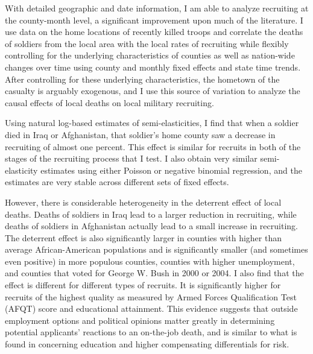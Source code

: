 \documentclass[12pt] {article}
\begin{document}
With detailed geographic and date information, I am able to analyze recruiting at the county-month
level, a significant improvement upon much of the literature. I use data on the home locations of recently killed troops and correlate the deaths of soldiers from the local area with the local rates of recruiting while flexibly controlling for the underlying characteristics of counties as well as nation-wide changes over time using county and monthly fixed effects and state time trends. After controlling for these underlying characteristics, the hometown of the casualty is arguably exogenous, and I use this source of variation to analyze the causal effects of local deaths on local military recruiting. 

Using natural log-based estimates of semi-elasticities, I
find that when a soldier died in Iraq or Afghanistan, that soldier's
home county saw a decrease in recruiting of almost one percent. This
effect is similar for recruits in both of the stages of the recruiting
process that I test. I also obtain very similar semi-elasticity estimates
using either Poisson or negative binomial regression, and the estimates are very stable across different sets of fixed effects. %

However, there is considerable heterogeneity in the deterrent effect of local deaths. Deaths of soldiers in Iraq lead to a larger reduction in recruiting, while deaths of soldiers in Afghanistan actually lead to a small increase in recruiting. The deterrent effect is also significantly larger in counties with higher than average African-American populations and is significantly smaller (and sometimes even positive) in more populous counties, counties with higher unemployment, and counties that voted for George W. Bush in 2000 or 2004. I also find that the effect is different for different types of recruits. %
It is significantly higher for recruits of the highest quality as measured by Armed Forces Qualification Test (AFQT) score and educational attainment. This evidence suggests that outside employment options and political opinions matter greatly in determining potential applicants' reactions to an on-the-job death, and is similar to what is found in \cite{kahn1987occupational} concerning education and higher compensating differentials for risk.
\end{document}
